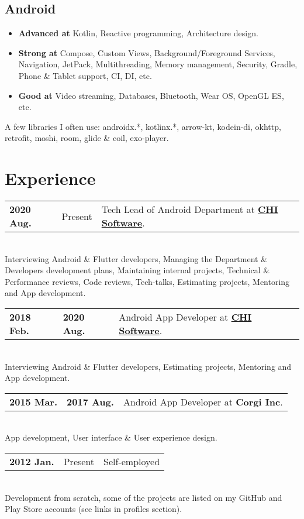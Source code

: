 \documentclass[a4paper]{article}
\begin{document}
	\subsection*{Android}
	\begin{multicols}{2}
	\begin{itemize}
		\item \textbf{Advanced at} Kotlin, Reactive programming, Architecture design.
		\item \textbf{Strong at} Compose, Custom Views, Background/Foreground Services, Navigation, JetPack, Multithreading, Memory management, Security, Gradle, Phone \& Tablet support, CI, DI, etc.
		\item \textbf{Good at} Video streaming, Databases, Bluetooth, Wear OS, OpenGL ES, etc.
	\end{itemize}
	\end{multicols}
	
	{ \footnotesize
	A few libraries I often use: androidx.*, kotlinx.*, arrow-kt, kodein-di, okhttp, retrofit, moshi, room, glide \& coil, exo-player.       
	}
	
	\section*{Experience}
	\begin{tabular}{@{}l@{\enspace--\enspace}ll}
		\textbf{2020 Aug.} & Present & Tech Lead of Android Department at \href{https://chisw.com}{\textbf{CHI Software}}. \\
	\end{tabular} \\[0.2em]
	Interviewing Android \& Flutter developers, Managing the Department \& Developers development plans, Maintaining internal projects, Technical \& Performance reviews, Code reviews, Tech-talks, Estimating projects, Mentoring and App development. \\[0.4em]
	\begin{tabular}{@{}l@{\enspace--\enspace}ll}
		\textbf{2018 Feb.} & \textbf{2020 Aug.} & Android App Developer at \href{https://chisw.com}{\textbf{CHI Software}}. \\
	\end{tabular} \\[0.2em]
	Interviewing Android \& Flutter developers, Estimating projects, Mentoring and App development.  \\[0.4em]   
	\begin{tabular}{@{}l@{\enspace--\enspace}ll}
		\textbf{2015 Mar.} & \textbf{2017 Aug.} & Android App Developer at \textbf{Corgi Inc}. \\
	\end{tabular} \\[0.2em]
	App development, User interface \& User experience design.   \\[0.4em]   
	\begin{tabular}{@{}l@{\enspace--\enspace}ll}
		\textbf{2012 Jan.} & Present & Self-employed \\
	\end{tabular} \\[0.2em]
	Development from scratch, some of the projects are listed on my GitHub and Play Store accounts (see links in profiles section).   
\end{document}
